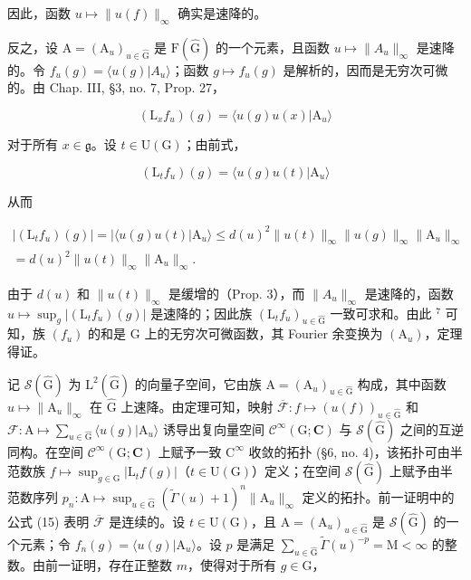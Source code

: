 因此，函数 \(u \mapsto \|u(f)\|_{\infty}\) 确实是速降的。

反之，设 \(\mathrm{A} = (\mathrm{A}_{u})_{u \in \hat{\mathrm{G}}}\) 是 \(\mathrm{F}(\hat{\mathrm{G}})\) 的一个元素，且函数 \(u \mapsto \|A_{u}\|_{\infty}\) 是速降的。令 \(f_{u}(g) = \langle u(g)|A_{u} \rangle\)；函数 \(g \mapsto f_{u}(g)\) 是解析的，因而是无穷次可微的。由 Chap. III, §3, no. 7, Prop. 27，

\[
(\mathrm{L} _ {x} f _ {u}) (g) = \langle u (g) u (x) | \mathrm{A} _ {u} \rangle
\]

对于所有 \(x \in \mathfrak{g}\)。设 \(t \in \mathrm{U}(\mathrm{G})\)；由前式，

\[
(\mathrm{L} _ {t} f _ {u}) (g) = \langle u (g) u (t) | \mathrm{A} _ {u} \rangle
\]

从而

\[
\begin{array}{r} | (\mathrm{L} _ {t} f _ {u}) (g) | = | \langle u (g) u (t) | \mathrm{A} _ {u} \rangle \leq d (u) ^ {2} \| u (t) \| _ {\infty} \| u (g) \| _ {\infty} \| \mathrm{A} _ {u} \| _ {\infty} \\ = d (u) ^ {2} \| u (t) \| _ {\infty} \| \mathrm{A} _ {u} \| _ {\infty}. \end{array}
\]

由于 \(d(u)\) 和 \(\|u(t)\|_{\infty}\) 是缓增的（Prop. 3），而 \(\|A_{u}\|_{\infty}\) 是速降的，函数 \(u \mapsto \sup_{g} |(\mathrm{L}_{t}f_{u})(g)|\) 是速降的；因此族 \((\mathrm{L}_{t}f_{u})_{u \in \hat{\mathrm{G}}}\) 一致可求和。由此 \(^{7}\) 可知，族 \((f_{u})\) 的和是 G 上的无穷次可微函数，其 Fourier 余变换为 \((\mathrm{A}_{u})\)，定理得证。

记 \(\mathcal{S}(\hat{\mathrm{G}})\) 为 \(\mathrm{L}^2 (\hat{\mathrm{G}})\) 的向量子空间，它由族 \(\mathrm{A} = (\mathrm{A}_u)_{u\in \hat{\mathrm{G}}}\) 构成，其中函数 \(u\mapsto \| \mathrm{A}_u\|_\infty\) 在 \(\hat{\mathrm{G}}\) 上速降。由定理可知，映射 \(\overline{\mathcal{F}}:f\mapsto (u(f))_{u\in \hat{\mathrm{G}}}\) 和 \(\mathcal{F}\colon \mathrm{A}\mapsto \sum_{u\in \hat{\mathrm{G}}}\langle u(g)|\mathrm{A}_u\rangle\) 诱导出复向量空间 \(\mathcal{C}^\infty (\mathrm{G};\mathbf{C})\) 与 \(\mathcal{S}(\hat{\mathrm{G}})\) 之间的互逆同构。在空间 \(\mathcal{C}^\infty (\mathrm{G};\mathbf{C})\) 上赋予一致 \(\mathrm{C}^\infty\) 收敛的拓扑 (§6, no. 4)，该拓扑可由半范数族 \(f\mapsto \sup_{g\in \mathrm{G}}|\mathrm{L}_t f(g)|\)（\(t\in \mathrm{U}(\mathrm{G})\)）定义；在空间 \(\mathcal{S}(\hat{\mathrm{G}})\) 上赋予由半范数序列 \(p_n:\mathrm{A}\mapsto \sup_{u\in \hat{\mathrm{G}}}(\tilde{\Gamma} (u) + 1)^n\| \mathrm{A}_u\|_\infty\) 定义的拓扑。前一证明中的公式 (15) 表明 \(\overline{\mathcal{F}}\) 是连续的。设 \(t\in \mathrm{U}(\mathrm{G})\)，且 \(\mathrm{A} = (\mathrm{A}_u)_{u\in \hat{\mathrm{G}}}\) 是 \(\mathcal{S}(\hat{\mathrm{G}})\) 的一个元素；令 \(f_{n}(g) = \langle u(g)|\mathrm{A}_{u}\rangle\)。设 \(p\) 是满足 \(\sum_{u\in \hat{\mathrm{G}}} \tilde{\Gamma} (u)^{-p} = \mathrm{M} < \infty\) 的整数。由前一证明，存在正整数 \(m\)，使得对于所有 \(g\in \mathrm{G}\)，

